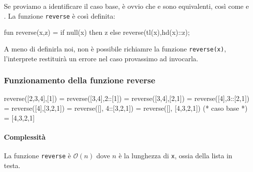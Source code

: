 \documentclass{article}
\newcommand\Omicron{\mathcal{O}}
\begin{document}
Se proviamo a identificare il caso base, è ovvio che  e  sono equivalenti, così come  e .
La funzione \texttt{reverse} è così definita:
\begin{smlcode}
fun reverse(x,z) = if null(x) then
				       z
				   else
				       reverse(tl(x),hd(x)::z);
\end{smlcode}
A meno di definirla noi, non è possibile richiamre la funzione \texttt{reverse(x)}, l'interprete restituirà un errore nel caso provassimo ad invocarla.

\subsubsection{Funzionamento della funzione reverse}

\begin{smlcode}
  reverse([2,3,4],[1])
= reverse([3,4],2::[1])
= reverse([3,4],[2,1])
= reverse([4],3::[2,1])
= reverse([4],[3,2,1])
= reverse([], 4::[3,2,1])
= reverse([], [4,3,2,1]) (* caso base *)
= [4,3,2,1]
\end{smlcode}
\paragraph{Complessità}
La funzione \texttt{reverse} è \(\Omicron(n)\) dove \(n\) è la lunghezza di \texttt{x}, ossia della lista in testa.
\end{document}
